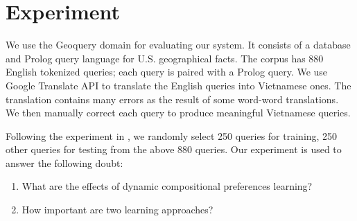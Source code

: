 \chapter{Experiment}
We use the Geoquery domain for evaluating our system. It consists of a database and Prolog query language for U.S. geographical facts. The corpus has 880 English tokenized queries; each query is paired with a Prolog query. We use Google Translate API to translate the English queries into Vietnamese ones. The translation contains many errors as the result of some word-word translations. We then manually correct each query to produce meaningful Vietnamese queries. 

Following the experiment in \cite{Clarke:2010:DSP:1870568.1870571}, we randomly select 250 queries for training, 250 other queries for testing from the above 880 queries. Our experiment is used to answer the following doubt:

\begin{enumerate}
  \item What are the effects of dynamic compositional preferences learning?
  \item How important are two learning approaches?
\end{enumerate}

